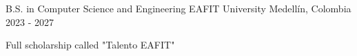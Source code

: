 

\begin{cventries}

  \cventry
    {B.S. in Computer Science and Engineering} %
    {EAFIT University} %
    {Medellín, Colombia} %
    {2023 - 2027} %
    {
      \begin{cvitems} %
        \item {Full scholarship called "Talento EAFIT"}
      \end{cvitems}
    }

\end{cventries}

